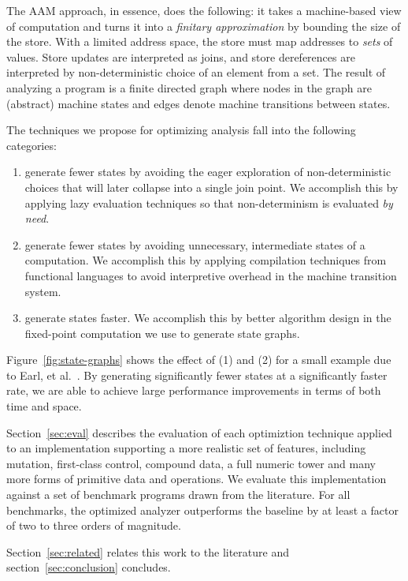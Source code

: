 \documentclass[preprint,onecolumn,9pt]{sigplanconf} %
\begin{document}
The AAM approach, in essence, does the following: it takes a
machine-based view of computation and turns it into a \emph{finitary
  approximation} by bounding the size of the store.  With a limited
address space, the store must map addresses to \emph{sets} of values.
Store updates are interpreted as joins, and store dereferences are
interpreted by non-deterministic choice of an element from a set.  The
result of analyzing a program is a finite directed graph where nodes
in the graph are (abstract) machine states and edges denote machine
transitions between states.

The techniques we propose for optimizing analysis fall into the
following categories:
\begin{enumerate}
\item generate fewer states by avoiding the eager exploration of
  non-deterministic choices that will later collapse into a single
  join point.  We accomplish this by applying lazy evaluation
  techniques so that non-determinism is evaluated \emph{by need}.

\item generate fewer states by avoiding unnecessary, intermediate
  states of a computation.  We accomplish this by applying compilation
  techniques from functional languages to avoid interpretive overhead
  in the machine transition system.

\item generate states faster.  We accomplish this by better algorithm
  design in the fixed-point computation we use to generate state graphs.
\end{enumerate}
Figure~\ref{fig:state-graphs} shows the effect of (1) and (2) for a
small example due to Earl, et
al.~\cite{dvanhorn:Earl2012Introspective}.
By generating significantly fewer states at a significantly faster
rate, we are able to achieve large performance improvements in terms
of both time and space.

Section~\ref{sec:eval} describes the evaluation of each optimiztion
technique applied to an implementation supporting a more realistic set
of features, including mutation, first-class control, compound data, a
full numeric tower and many more forms of primitive data and
operations.
%
We evaluate this implementation against a set of benchmark programs
drawn from the literature.
%
For all benchmarks, the optimized analyzer outperforms the baseline
by at least a factor of
two to
three orders of magnitude.

Section~\ref{sec:related} relates this work to the literature and
section~\ref{sec:conclusion} concludes.
\end{document}
